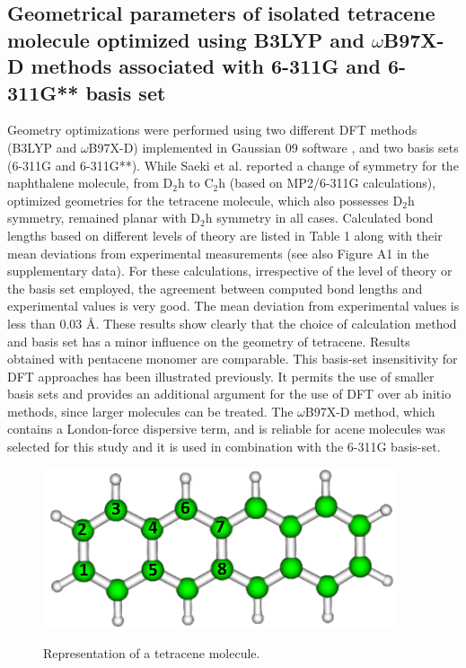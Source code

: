 \subsection{Geometrical parameters of isolated tetracene molecule optimized using B3LYP and $\omega$B97X-D methods associated with 6-311G and 6-311G** basis set}

Geometry optimizations were performed using two different DFT methods (B3LYP and $\omega$B97X-D) implemented in Gaussian 09 software \cite{frisch2009gaussian}, and two basis sets (6-311G and 6-311G**). While Saeki et al. \cite{saeki2006theoretical}  reported a change of symmetry for the naphthalene molecule, from D$_{2}$h to C$_{2}$h (based on MP2/6-311G calculations), optimized geometries for the tetracene molecule, which also possesses D$_{2}$h symmetry, remained planar with D$_{2}$h symmetry in all cases. Calculated bond lengths based on different levels of theory are listed in Table 1 along with their mean deviations from experimental measurements (see also Figure A1 in the supplementary data). For these calculations, irrespective of the level of theory or the basis set employed, the agreement between computed bond lengths and experimental values is very good. The mean deviation from experimental values is less than 0.03 Å. These results show clearly that the choice of calculation method and basis set has a minor influence on the geometry of tetracene. Results obtained with pentacene monomer are comparable. This basis-set insensitivity for DFT approaches has been illustrated previously\cite{bauschlicher1995sensitivity}. It permits the use of smaller basis sets and provides an additional argument for the use of DFT over ab initio methods, since larger molecules can be treated. The $\omega$B97X-D method, which contains a London-force dispersive term, and is reliable for acene molecules was selected for this study and it is used in combination with the 6-311G basis-set.

\begin{figure}[H]
	\centering
	\includegraphics[scale=0.6]{image/tetracene-molecule}\label{tetracene-molecule}
	\caption{Representation of a tetracene molecule.}
\end{figure}

